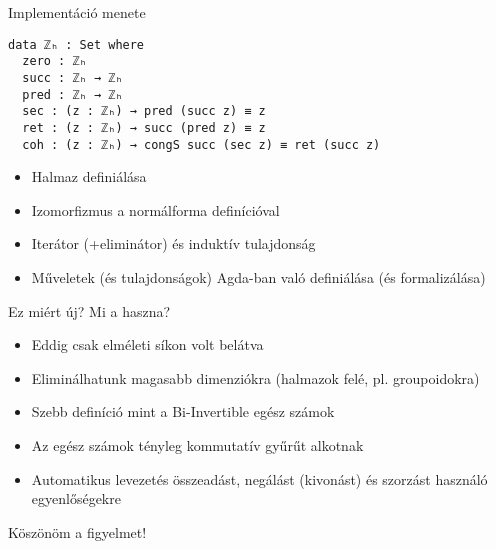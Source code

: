 \documentclass[14pt, aspectratio=1610]{beamer}
\begin{document}
\begin{frame}[fragile]{Implementáció menete}

\begin{verbatim}
data ℤₕ : Set where
  zero : ℤₕ
  succ : ℤₕ → ℤₕ
  pred : ℤₕ → ℤₕ
  sec : (z : ℤₕ) → pred (succ z) ≡ z
  ret : (z : ℤₕ) → succ (pred z) ≡ z
  coh : (z : ℤₕ) → congS succ (sec z) ≡ ret (succ z)
\end{verbatim}

\begin{itemize}
    \item<+-> Halmaz definiálása
    \item<+-> Izomorfizmus a normálforma definícióval
    \item<+-> Iterátor (+eliminátor) és induktív tulajdonság
    \item<+-> Műveletek (és tulajdonságok) Agda-ban való definiálása (és formalizálása)
\end{itemize}

\end{frame}

\begin{frame}{Ez miért új? Mi a haszna?}

\begin{itemize}
    \item<+-> Eddig csak elméleti síkon volt belátva
    \item<+-> Eliminálhatunk magasabb dimenziókra (halmazok felé, pl. groupoidokra)
    \item<+-> Szebb definíció mint a Bi-Invertible egész számok
    \item<+-> Az egész számok tényleg kommutatív gyűrűt alkotnak
    \item<+-> Automatikus levezetés összeadást, negálást (kivonást) és szorzást használó egyenlőségekre
\end{itemize}

\end{frame}

\begin{frame}[plain]
  \centering
  \Huge
  Köszönöm a figyelmet!
\end{frame}
\end{document}
